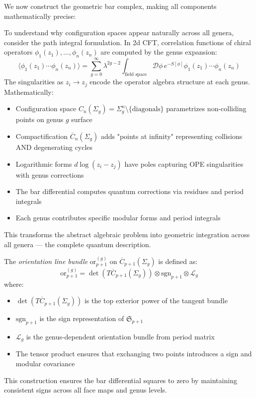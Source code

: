 We now construct the geometric bar complex, making all components mathematically precise:
 
\begin{remark}
To understand why configuration spaces appear naturally across all genera, consider the path integral formulation. In 2d CFT, correlation functions of chiral operators $\phi_1(z_1), \ldots, \phi_n(z_n)$ are computed by the genus expansion:
\[
\langle \phi_1(z_1) \cdots \phi_n(z_n) \rangle = \sum_{g=0}^{\infty} \lambda^{2g-2} \int_{\text{field space}} \mathcal{D}\phi \, e^{-S[\phi]} \phi_1(z_1) \cdots \phi_n(z_n)
\]
The singularities as $z_i \to z_j$ encode the operator algebra structure at each genus. Mathematically:
\begin{itemize}
\item Configuration space $C_n(\Sigma_g) = \Sigma_g^n \setminus \{\text{diagonals}\}$ parametrizes non-colliding points on genus $g$ surface
\item Compactification $\overline{C}_n(\Sigma_g)$ adds "points at infinity" representing collisions AND degenerating cycles
\item Logarithmic forms $d\log(z_i - z_j)$ have poles capturing OPE singularities with genus corrections
\item The bar differential computes quantum corrections via residues and period integrals
\item Each genus contributes specific modular forms and period integrals
\end{itemize}
This transforms the abstract algebraic problem into geometric integration across all genera --- the complete quantum description.
\end{remark}

\begin{definition}\label{def:orientation}
The \emph{orientation line bundle} $\text{or}_{p+1}^{(g)}$ on $\overline{C}_{p+1}(\Sigma_g)$ is defined as:
\[
\text{or}_{p+1}^{(g)} = \det(T\overline{C}_{p+1}(\Sigma_g)) \otimes \text{sgn}_{p+1} \otimes \mathcal{L}_g
\]
where:
\begin{itemize}
\item $\det(T\overline{C}_{p+1}(\Sigma_g))$ is the top exterior power of the tangent bundle
\item $\text{sgn}_{p+1}$ is the sign representation of $\mathfrak{S}_{p+1}$
\item $\mathcal{L}_g$ is the genus-dependent orientation bundle from period matrix
\item The tensor product ensures that exchanging two points introduces a sign and modular covariance
\end{itemize}
This construction ensures the bar differential squares to zero by maintaining consistent signs across all face maps and genus levels.
\end{definition}

